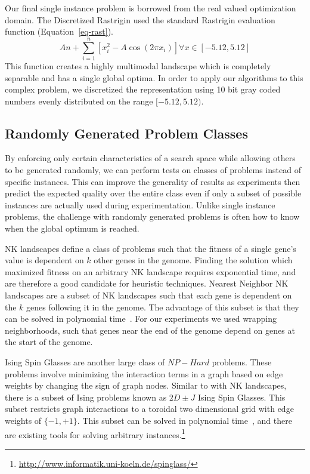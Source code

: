 \documentclass{sig-alternate}
\begin{document}
Our final single instance problem is borrowed from the real valued optimization domain.
The Discretized Rastrigin used the standard Rastrigin evaluation function (Equation~\ref{eq-rast}).
\begin{equation}
  An + \sum_{i=1}^{n}\left [ x_i^2-A\cos (2\pi x_i) \right ] \forall x\in [-5.12,5.12]
  \label{eq-rast}
\end{equation}
This function creates a highly multimodal landscape which is completely separable
and has a single global optima.  In order to apply our algorithms to this complex problem,
we discretized the representation using 10 bit gray coded numbers evenly distributed
on the range $[-5.12,5.12)$.

\subsection{Randomly Generated Problem Classes}
By enforcing only certain characteristics of a search space while allowing others
to be generated randomly, we can perform tests on classes of problems instead
of specific instances.  This can improve the generality of results as experiments
then predict the expected quality over the entire class even if only a subset
of possible instances are actually used during experimentation.  Unlike single
instance problems, the challenge with randomly generated problems is often how
to know when the global optimum is reached.

NK landscapes define a class of problems such that the fitness of a single gene's
value is dependent on $k$ other genes in the genome.  Finding the solution which
maximized fitness on an arbitrary NK landscape requires exponential time, and
are therefore a good candidate for heuristic techniques.  Nearest Neighbor NK
landscapes are a subset of NK landscapes such that each gene is dependent on the $k$
genes following it in the genome.  The advantage of this subset is that they can be
solved in polynomial time~\cite{wright:2000:solvingnk}.  For our experiments we
used wrapping neighborhoods, such that genes near the end of the genome depend on
genes at the start of the genome.

Ising Spin Glasses are another large class of $NP-Hard$ problems.  These problems
involve minimizing the interaction terms in a graph based on edge weights by changing
the sign of graph nodes.  Similar to with NK landscapes, there is a subset of Ising problems
known as $2D\pm J$ Ising Spin Glasses.  This subset restricts graph interactions to a
toroidal two dimensional grid with edge weights of $\{-1, +1\}$.  This subset can
be solved in polynomial time~\cite{saul:1994:spinglass}, and there are existing
tools for solving arbitrary instances.\footnote{\url{http://www.informatik.uni-koeln.de/spinglass/}}
\end{document}
